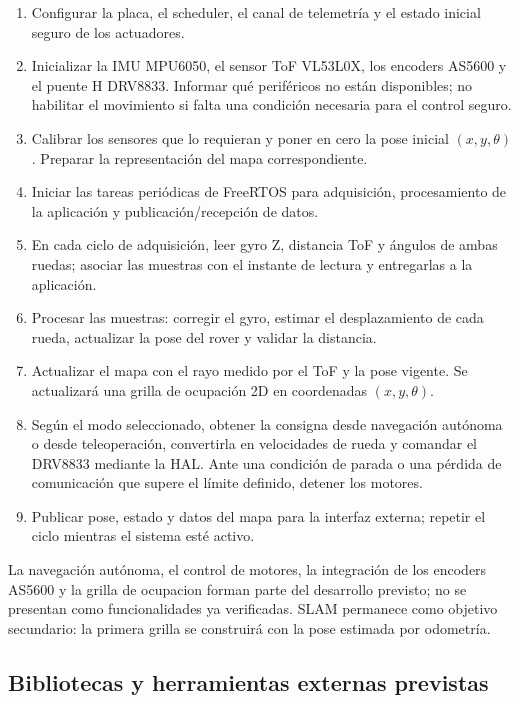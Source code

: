 \documentclass[11pt,a4paper]{article}
\begin{document}
\begin{enumerate}
  \item Configurar la placa, el scheduler, el canal de telemetría y el estado
        inicial seguro de los actuadores.
  \item Inicializar la IMU MPU6050, el sensor ToF VL53L0X, los encoders AS5600
        y el puente H DRV8833. Informar qué periféricos no están disponibles;
        no habilitar el movimiento si falta una condición necesaria para el
        control seguro.
  \item Calibrar los sensores que lo requieran y poner en cero la pose inicial
        $(x,y,\theta)$. Preparar la representación del mapa correspondiente.
  \item Iniciar las tareas periódicas de FreeRTOS para adquisición,
        procesamiento de la aplicación y publicación/recepción de datos.
  \item En cada ciclo de adquisición, leer gyro Z, distancia ToF y ángulos de
        ambas ruedas; asociar las muestras con el instante de lectura y
        entregarlas a la aplicación.
  \item Procesar las muestras: corregir el gyro, estimar el desplazamiento de
        cada rueda, actualizar la pose del rover y validar la distancia.
  \item Actualizar el mapa con el rayo medido por el ToF y la pose vigente.
 Se actualizará una grilla de ocupación 2D en
        coordenadas $(x,y,\theta)$.
  \item Según el modo seleccionado, obtener la consigna desde navegación
        autónoma o desde teleoperación, convertirla en velocidades de rueda y
        comandar el DRV8833 mediante la HAL. Ante una condición de parada o una
        pérdida de comunicación que supere el límite definido, detener los
        motores.
  \item Publicar pose, estado y datos del mapa para la interfaz externa;
        repetir el ciclo mientras el sistema esté activo.
\end{enumerate}

La navegación autónoma, el control de motores, la integración de los encoders AS5600 y la
grilla de ocupacion forman parte del desarrollo previsto; no se presentan como
funcionalidades ya verificadas. SLAM permanece como objetivo secundario: la
primera grilla se construirá con la pose estimada por odometría.

\subsection{Bibliotecas y herramientas externas previstas}
\end{document}
